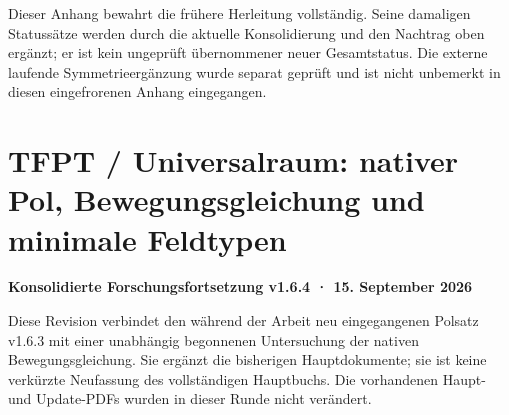 Dieser Anhang bewahrt die frühere Herleitung vollständig. Seine
damaligen Statussätze werden durch die aktuelle Konsolidierung und den
Nachtrag oben ergänzt; er ist kein ungeprüft übernommener neuer
Gesamtstatus. Die externe laufende Symmetrieergänzung wurde separat
geprüft und ist nicht unbemerkt in diesen eingefrorenen Anhang
eingegangen.

\section{TFPT / Universalraum: nativer Pol, Bewegungsgleichung und
minimale
Feldtypen}\label{tfpt-universalraum-nativer-pol-bewegungsgleichung-und-minimale-feldtypen}

\textbf{Konsolidierte Forschungsfortsetzung v1.6.4 · 15. September 2026}

Diese Revision verbindet den während der Arbeit neu eingegangenen
Polsatz v1.6.3 mit einer unabhängig begonnenen Untersuchung der nativen
Bewegungsgleichung. Sie ergänzt die bisherigen Hauptdokumente; sie ist
keine verkürzte Neufassung des vollständigen Hauptbuchs. Die vorhandenen
Haupt- und Update-PDFs wurden in dieser Runde nicht verändert.

